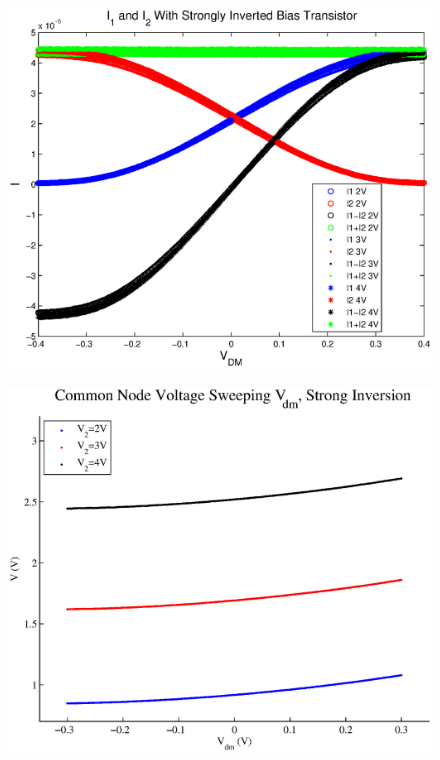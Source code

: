 \documentclass{article}
\begin{document}
\begin{figure}[H]
\centering
\includegraphics[scale=.95]{currents_strong.eps}
\label{strong}
\caption{}
\end{figure}

\begin{figure}[H]
\centering
\includegraphics[scale=.7]{plot_strong_v.eps}
\label{strongV}
\caption{}
\end{figure}
\end{document}
